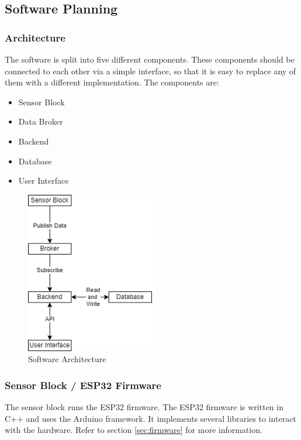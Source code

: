 \newpage
\subsection{Software Planning}

\subsubsection{\Gls{Architecture}}
The software is split into five different components. These components should be connected to each other via a simple interface, so that it is easy to replace any of them with a different implementation.
The components are:
\begin{itemize}
    \item \Gls{Sensor Block}
    \item \Gls{Data Broker}
    \item \Gls{Backend}
    \item \Gls{Database}
    \item \Gls{User Interface}
\end{itemize}

\begin{figure}
    \centering
    \includegraphics[width=0.5\textwidth]{figures/hivetracker_software_architecture.png}
    \caption{Software Architecture}
    \label{fig:software_architecture}
\end{figure}

\subsubsection{Sensor Block / \Gls{ESP32} \Gls{Firmware}}
The sensor block runs the ESP32 firmware. The ESP32 firmware is written in C++ and uses the Arduino framework. It implements several libraries to interact with the hardware. Refer to section \ref{sec:firmware} for more information.

